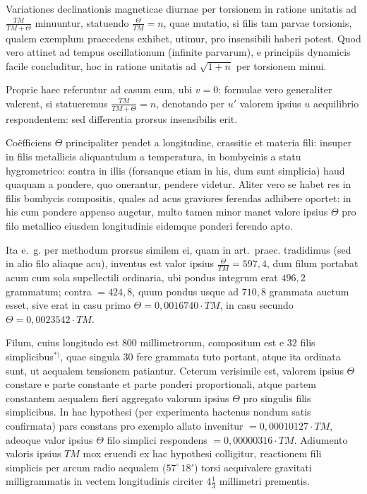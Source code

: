 \documentclass[fontsize=11pt,paper=a4,twoside,openany]{scrbook}
\begin{document}
\section{}

Variationes declinationis magneticae diurnae per torsionem in ratione unitatis ad $\frac{TM}{TM+\Theta}$ minuuntur, statuendo $\frac{\Theta}{TM}=n$, quae mutatio, si filis tam parvae torsionis, qualem exemplum praecedens exhibet, utimur, pro insensibili haberi potest. Quod vero attinet ad tempus oscillationum (infinite parvarum), e principiis dynamicis facile concluditur, hoc in ratione unitatis ad $\sqrt{1+n}$ per torsionem minui.

Proprie haec referuntur ad casum eum, ubi $v=0$: formulae vero generaliter valerent, si statueremus $\frac{TM}{TM+\Theta}=n$, denotando per $u'$ valorem ipsius $u$ aequilibrio respondentem: sed differentia prorsus insensibilis erit.

Coëfficiens $\Theta$ principaliter pendet a longitudine, crassitie et materia fili: insuper in filis metallicis aliquantulum a temperatura, in bombycinis a statu hygrometrico: contra in illis (forsanque etiam in his, dum sunt simplicia) haud quaquam a pondere, quo onerantur, pendere videtur. Aliter vero se habet res in filis bombycis compositis, quales ad acus graviores ferendas adhibere oportet: in his cum pondere appenso augetur, multo tamen minor manet valore ipsius $\Theta$ pro filo metallico eiusdem longitudinis eidemque ponderi ferendo apto.

Ita e.~g. per methodum prorsus similem ei, quam in art.~praec. tradidimus (sed in alio filo aliaque acu), inventus est valor ipsius $\frac{\Theta}{TM}=597{,}4$, dum filum portabat acum cum sola supellectili ordinaria, ubi pondus integrum erat $496{,}2$ grammatum; contra $=424{,}8$, quum pondus usque ad $710{,}8$ grammata auctum esset, sive erat in casu primo $\Theta=0{,}0016740\cdot TM$, in casu secundo $\Theta=0{,}0023542\cdot TM$.

Filum, cuius longitudo est $800$ millimetrorum, compositum est e $32$ filis simplicibus$^{*)}$, quae singula $30$ fere grammata tuto portant, atque ita ordinata sunt, ut aequalem tensionem patiantur. Ceterum verisimile est, valorem ipsius $\Theta$ constare e parte constante et parte ponderi proportionali, atque partem constantem aequalem fieri aggregato valorum ipsius $\Theta$ pro singulis filis simplicibus. In hac hypothesi (per experimenta hactenus nondum satis confirmata) pars constans pro exemplo allato invenitur $=0{,}00010127\cdot TM$, adeoque valor ipsius $\Theta$ filo simplici respondens $=0{,}00000316\cdot TM$. Adiumento valoris ipsius $TM$ mox eruendi ex hac hypothesi colligitur, reactionem fili simplicis per arcum radio aequalem ($57^\circ\,18'$) torsi aequivalere gravitati milligrammatis in vectem longitudinis circiter $4\frac{1}{3}$ millimetri prementis.
\end{document}
